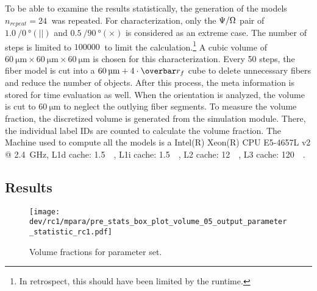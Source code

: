 % 
To be able to examine the results statistically, the generation of the models $n_{\mathit{repeat}} = \SI{24}{}$ was repeated.
For characterization, only the $\textnormal{$\Psi$}/\textnormal{$\Omega$}$ pair of $\SI{1.0}{}/\SI{0}{\degree}(||)$ and $\SI{0.5}{}/\SI{90}{\degree}(\times)$ is considered as an extreme case.
The number of steps is limited to $\SI{100000}{}$ to limit the calculation.\footnote{In retrospect, this should have been limited by the runtime.}
A cubic volume of $\SI{60}{\micro\meter} \times \SI{60}{\micro\meter} \times \SI{60}{\micro\meter}$ is chosen for this characterization.
Every 50 steps, the fiber model is cut into a $\SI{60}{\micro\meter}+4 \cdot \fiberRadiusMean$ cube to delete unnecessary fibers and reduce the number of objects. After this process, the meta information is stored for time evaluation as well.
When the orientation is analyzed, the volume is cut to $\SI{60}{\micro\meter}$ to neglect the outlying fiber segments.
To measure the volume fraction, the discretized volume is generated from the simulation module.
There, the individual label IDs are counted to calculate the volume fraction.
% 
The Machine used to compute all the models is a 
Intel(R) Xeon(R) CPU E5-4657L v2 @ \SI{2.4}{\giga\hertz}, L1d cache: \SI{1.5}{\mega\byte}, L1i cache: \SI{1.5}{\mega\byte}, L2 cache: \SI{12}{\mega\byte}, L3 cache: \SI{120}{\mega\byte}.
% 
% 
% 
\subsection{Results}
% 
\begin{figure}[t]
\centering
\texttt{[image: dev/rc1/mpara/pre\_stats\_box\_plot\_volume\_05\_output\_parameter\_statistic\_rc1.pdf]}
\caption[Volume fraction]{Volume fractions for parameter set.}
\label{fig:psbp1}
\end{figure}
% 
